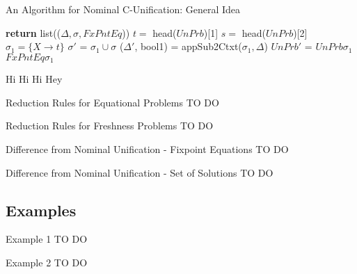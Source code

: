 \begin{frame}[allowframebreaks]{An Algorithm for Nominal C-Unification: General Idea}
    \begin{algorithmic}[1]
            \State \textbf{return} list(($\Delta, \sigma, FxPntEq$)) 
        \Else 
        \State $t =$ head($UnPrb$)[1]
        \State $s =$ head($UnPrb$)[2]
                \State $\sigma_1 = \{X \rightarrow t \}$
                \State $\sigma'$ = $\sigma_1 \cup \sigma$ 
                \State ($\Delta'$, bool1) = appSub2Ctxt($\sigma_1, \Delta$) 
                \State $UnPrb'$ = $UnPrb\sigma_1$ \cup $FxPntEq\sigma_1$

                \State Hi
                \State Hi
                \State Hi
            \Else 
                \State Hey
            \Endif
        \Endif
        \EndProcedure
    \end{algorithmic}
\end{frame}

\begin{frame}{Reduction Rules for Equational Problems}
    TO DO 
\end{frame}

\begin{frame}{Reduction Rules for Freshness Problems}
    TO DO 
\end{frame}

\begin{frame}{Difference from Nominal Unification - Fixpoint Equations}
    TO DO
\end{frame}

\begin{frame}{Difference from Nominal Unification - Set of Solutions}
    TO DO
\end{frame}

\subsection{Examples}
\begin{frame}{Example 1}
    TO DO
\end{frame}

\begin{frame}{Example 2}
    TO DO 
\end{frame}
